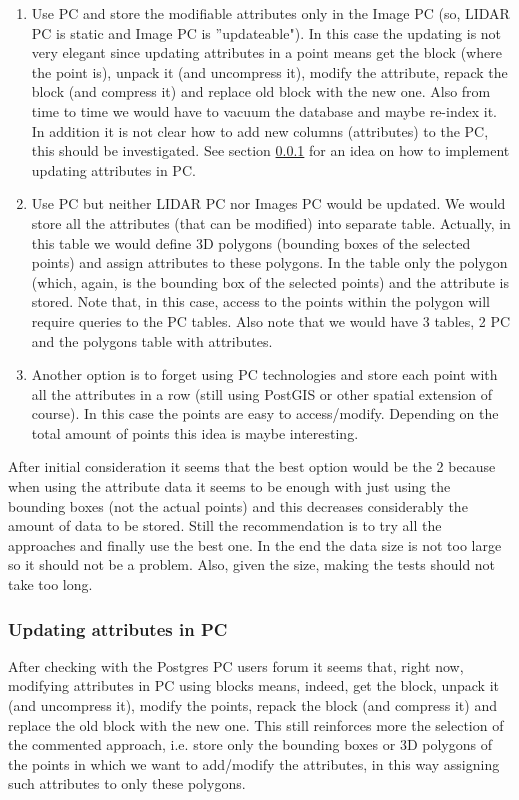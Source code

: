 \documentclass[a4paper,11pt]{article}
\begin{document}
\begin{enumerate}
	\item Use PC and store the modifiable attributes only in the Image PC (so, LIDAR PC is static and Image PC is ''updateable"). In this case the updating is not very elegant since updating attributes in a point means get the block (where the point is), unpack it (and uncompress it), modify the attribute, repack the block (and compress it) and replace old block with the new one. Also from time to time  we would have to vacuum the database and maybe re-index it. In addition it is not clear how to add new columns (attributes) to the PC, this should be investigated. See section \ref{sec:attrPC} for an idea on how to implement updating attributes in PC.
	\item Use PC but neither LIDAR PC nor Images PC would be updated. We would store all the attributes (that can be modified) into separate table. Actually, in this table we would define 3D polygons (bounding boxes of the selected points) and assign attributes to these polygons. In the table only the polygon (which, again, is the bounding box of the selected points) and the attribute is stored. Note that, in this case, access to the points within the polygon will require queries to the PC tables. Also note that we would have 3 tables, 2 PC and the polygons table with attributes.
	\item Another option is to forget using PC technologies and store each point with all the attributes in a row (still using PostGIS or other spatial extension of course). In this case the points are easy to access/modify. Depending on the total amount of points this idea is maybe interesting.
\end{enumerate}

After initial consideration it seems that the best option would be the 2 because when using the attribute data it seems to be enough with just using the bounding boxes (not the actual points) and this decreases considerably the amount of data to be stored. Still the recommendation is to try all the approaches and finally use the best one. In the end the data size is not too large so it should not be a problem. Also, given the size, making the tests should not take too long.

\subsubsection{Updating attributes in PC}
\label{sec:attrPC}

After checking with the Postgres PC users forum it seems that, right now, modifying attributes in PC using blocks means, indeed, get the block, unpack it (and uncompress it), modify the points, repack the block (and compress it) and replace the old block with the new one. This still reinforces more the selection of the commented approach, i.e. store only the bounding boxes or 3D polygons of the points in which we want to add/modify the attributes, in this way assigning such attributes to only these polygons.
\end{document}

